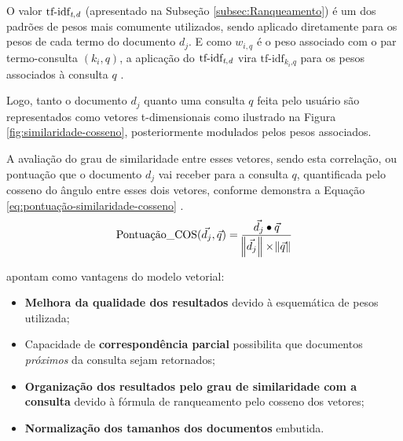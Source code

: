         O valor $\text{tf-idf}_{\text{\textit{t},\textit{d}}}$ (apresentado na Subseção \ref{subsec:Ranqueamento}) é um dos padrões de pesos mais comumente utilizados, sendo aplicado diretamente para os pesos de cada termo do documento $d_j$.
        E como $w_{i,q}$ é o peso associado com o par termo-consulta $(k_i, q)$, a aplicação do $\text{tf-idf}_{\text{\textit{t},\textit{d}}}$ vira $\text{tf-idf}_{k_i\text{,}\textit{q}}$ para os pesos associados à consulta $q$ \cite[p.~77--78]{Baeza-Yates2011}.
        
        Logo, tanto o documento $d_j$ quanto uma consulta $q$ feita pelo usuário são representados como vetores t-dimensionais como ilustrado na Figura \ref{fig:similaridade-cosseno}, posteriormente modulados pelos pesos associados.
        
        
        
        A avaliação do grau de similaridade entre esses vetores, sendo esta correlação, ou pontuação que o documento $d_j$ vai receber para a consulta $q$, quantificada pelo cosseno do ângulo entre esses dois vetores, conforme demonstra a Equação \ref{eq:pontuação-similaridade-cosseno} \cite[p.~78]{Baeza-Yates2011}.
        \begin{equation}
            \label{eq:pontuação-similaridade-cosseno}
    		\text{Pontuação\_COS}(\vec{d_j}, \vec{q}) = \frac{\vec{d_j} \bullet \vec{q} }{ \norm{\vec{d_j}} \times \norm{\vec{q}} }
        \end{equation}
    
        
         apontam como vantagens do modelo vetorial:
        \begin{itemize}
            \item \textbf{Melhora da qualidade dos resultados} devido à esquemática de pesos utilizada;
            
            \item Capacidade de \textbf{correspondência parcial} possibilita que documentos \textit{próximos} da consulta sejam retornados;
            
            \item \textbf{Organização dos resultados pelo grau de similaridade com a consulta} devido à fórmula de ranqueamento pelo cosseno dos vetores;
            
            \item \textbf{Normalização dos tamanhos dos documentos} embutida.
        \end{itemize}
        
